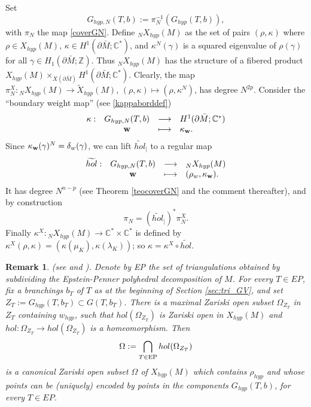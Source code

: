 \documentclass[11pt]{amsart}
\newtheorem{remark}[teo]{Remark}
\newcommand{\fonc}[5]{                     %
            \begin{array}{lcll}#1 :& #2 & \longrightarrow & #3 \\   %
                         &#4 &\longmapsto & #5          %
            \end{array}}
\newcommand{\mc}{\mathbb{C}}
\newcommand{\mz}{\mathbb{Z}}
\newcommand{\bw}{{\bf w}}
\newcommand{\ra}{\rightarrow}
\begin{document}
{Set
\begin{equation}\label{GhypNdef}
G_{hyp,N}(T,b):= \pi_N^{-1}(G_{hyp}(T,b)),
\end{equation} with $\pi_N$ the map \eqref{coverGN}. Define ${}_NX_{hyp}(M)$ as the set of pairs $(\rho,\kappa)$ where $\rho \in X_{hyp}(M)$, $\kappa\in H^1(\partial \bar M;\mc^*)$, and $\kappa^{N}(\gamma)$ is a squared eigenvalue of $\rho(\gamma)$ for all $\gamma\in H_1(\partial \bar M;\mz)$. Thus ${}_NX_{hyp}(M)$ has the structure of a fibered product $X_{hyp}(M) \times_{X(\partial \bar M)} H^1(\partial \bar M;\mc^*)$. Clearly, the map $\pi_N^X\colon {}_NX_{hyp}(M)\ra \tilde X_{hyp}(M)$, $(\rho,\kappa)\mapsto (\rho, \kappa^N)$, has degree $N^{2p}$. Consider the ``boundary weight map'' (see \eqref{kappaborddef})
\begin{equation}\label{defweightSept24}
\fonc{\kappa}{G_{hyp,N}(T,b)}{H^1(\partial \bar M;\mc^*)}{\bw}{\kappa_\bw.}
\end{equation}
Since $\kappa_\bw(\gamma)^{N}= \delta_w(\gamma)$, we can lift $\tilde{hol}_{\vert}$ to a regular map
\begin{equation}\label{grostildeholmars25}
\fonc{\widetilde{hol}}{G_{hyp,N}(T,b)}{{}_NX_{hyp}(M)}{\bw}{(\rho_w,\kappa_\bw).}
\end{equation}
It has degree $N^{n-p}$ (see Theorem \ref{teocoverGN} and the comment thereafter), and by construction $$\pi_N = (\tilde{hol}_{\vert})^*\pi_N^X.$$ Finally $\kappa^X\colon {}_NX_{hyp}(M) \ra \mc^* \times \mc^*$ is defined by $\kappa^X(\rho,\kappa) = (\kappa(\mu_K), \kappa(\lambda_K))$; so $\kappa = \kappa^X \circ \widetilde{hol}$.

\begin{remark}\label{mostrho}{\rm (see \cite[Proposition 4.6 and pages 2017-2019]{AGT} and \cite[Remark 1.4]{NA}). Denote by EP the set of triangulations obtained by subdividing the Epstein-Penner polyhedral decomposition  of $M$. For every $T\in EP$, fix a branchings $b_T$ of $T$ as at the beginning of Section \ref{sec:tri_GV}, and set $Z_T:=G_{hyp}(T,b_T)\subset G(T,b_T)$. There is a maximal Zariski open subset $\Omega_{Z_T}$ in $Z_T$ containing $w_{hyp}$, such that $hol(\Omega_{Z_T})$ is Zariski open in $X_{hyp}(M)$ and $hol\colon \Omega_{Z_T} \ra hol(\Omega_{Z_T})$ is a homeomorphism. Then $$\Omega := \bigcap_{T\in {\rm EP}} hol(\Omega_{Z_T})$$
is a canonical Zariski open subset $\Omega$ of $X_{hyp}(M)$ which contains $\rho_{hyp}$ and whose points can be (uniquely) encoded by points in the components $G_{hyp}(T,b)$, for every $T\in EP$.}
\end{remark} 

}
\end{document}

